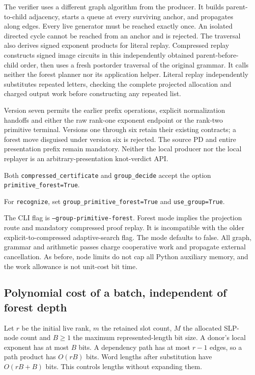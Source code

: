 The verifier uses a different graph algorithm from the producer. It builds
parent-to-child adjacency, starts a queue at every surviving anchor, and
propagates along edges. Every live generator must be reached exactly once.
An isolated directed cycle cannot be reached from an anchor and is rejected.
The traversal also derives signed exponent products for literal replay.
Compressed replay constructs signed image circuits in this independently
obtained parent-before-child order, then uses a fresh postorder traversal
of the original grammar. It calls neither the forest planner nor its
application helper. Literal replay independently substitutes repeated
letters, checking the complete projected allocation and charged output work
before constructing any repeated list.

Version seven permits the earlier prefix operations, explicit normalization
handoffs and either the raw rank-one exponent endpoint or the rank-two
primitive terminal. Versions one through six retain their existing contracts;
a forest move disguised under version six is rejected. The source PD and
entire presentation prefix remain mandatory. Neither the local producer nor
the local replayer is an arbitrary-presentation knot-verdict API.

Both \texttt{compressed\_certificate} and \texttt{group\_decide} accept
the option \texttt{primitive\_forest=True}.

For \texttt{recognize}, set \texttt{group\_primitive\_forest=True}
and \texttt{use\_group=True}.

The CLI flag is \texttt{--group-primitive-forest}. Forest mode implies the projection route
and mandatory compressed proof replay. It is incompatible with the older
explicit-to-compressed adaptive-search flag. The mode defaults to false.
All graph, grammar and arithmetic passes charge cooperative work and
propagate external cancellation. As before, node limits do not cap all
Python auxiliary memory, and the work allowance is not unit-cost bit time.

\subsection{Polynomial cost of a batch, independent of forest depth}

Let $r$ be the initial live rank, $m$ the retained slot count, $M$ the allocated
SLP-node count and $B\ge1$ the maximum represented-length bit size. A donor's
local exponent has at most $B$ bits. A dependency path has at most $r-1$
edges, so a path product has $O(rB)$ bits. Word lengths after substitution
have $O(rB+B)$ bits. This controls lengths without expanding them.

